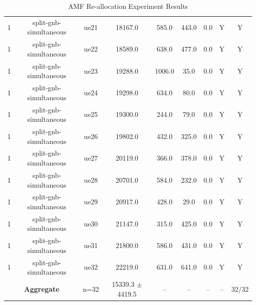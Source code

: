\begin{table}[ht]
\begin{tabular}{|c|c|c|c|c|c|c|c|c|}
1 & split-gnb-simultaneous & ue21 & 18167.0 & 585.0 & 443.0 & 0.0 & Y & Y \\
1 & split-gnb-simultaneous & ue22 & 18589.0 & 638.0 & 477.0 & 0.0 & Y & Y \\
1 & split-gnb-simultaneous & ue23 & 19288.0 & 1006.0 & 35.0 & 0.0 & Y & Y \\
1 & split-gnb-simultaneous & ue24 & 19298.0 & 634.0 & 80.0 & 0.0 & Y & Y \\
1 & split-gnb-simultaneous & ue25 & 19300.0 & 244.0 & 79.0 & 0.0 & Y & Y \\
1 & split-gnb-simultaneous & ue26 & 19802.0 & 432.0 & 325.0 & 0.0 & Y & Y \\
1 & split-gnb-simultaneous & ue27 & 20119.0 & 366.0 & 378.0 & 0.0 & Y & Y \\
1 & split-gnb-simultaneous & ue28 & 20701.0 & 584.0 & 232.0 & 0.0 & Y & Y \\
1 & split-gnb-simultaneous & ue29 & 20917.0 & 428.0 & 29.0 & 0.0 & Y & Y \\
1 & split-gnb-simultaneous & ue30 & 21147.0 & 315.0 & 425.0 & 0.0 & Y & Y \\
1 & split-gnb-simultaneous & ue31 & 21800.0 & 586.0 & 431.0 & 0.0 & Y & Y \\
1 & split-gnb-simultaneous & ue32 & 22219.0 & 631.0 & 641.0 & 0.0 & Y & Y \\
\multicolumn{2}{|c|}{\textbf{Aggregate}} & n=32 & 15339.3 $\pm$ 4419.5 & -- & -- & -- & -- & 32/32 \\
\hline
\end{tabular}
\caption{AMF Re-allocation Experiment Results}
\label{tab:amf_realloc}
\end{table}
